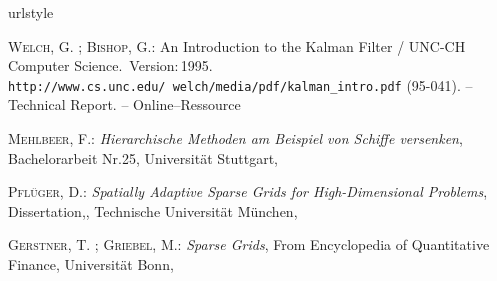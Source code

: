 \documentclass[a4paper,12pt]{llncs}
\numberwithin{equation}{section}
\begin{document}
\newpage

% 

\begin{thebibliography}{WB95}
	\providecommand{\url}[1]{\texttt{#1}}
	\expandafter\ifx\csname urlstyle\endcsname\relax
	\providecommand{\doi}[1]{doi: #1}\else
	\providecommand{\doi}{doi: \begingroup \urlstyle{rm}\Url}\fi
	
	\textsc{Welch}, G. ; \textsc{Bishop}, G.:
	\newblock An Introduction to the Kalman Filter  / UNC-CH Computer Science.
	\newblock \,Version:\,1995.
	\newblock  \url{http://www.cs.unc.edu/~welch/media/pdf/kalman_intro.pdf}
	(95-041). --
	\newblock Technical Report. --
	\newblock Online--Ressource
	
	\textsc{Mehlbeer}, F.:
	\newblock \textit{Hierarchische Methoden am Beispiel von Schiffe versenken},
	\newblock Bachelorarbeit Nr.25,
	\newblock Universität Stuttgart,
	
	\textsc{Pflüger}, D.:
	\newblock \textit{Spatially Adaptive Sparse Grids for High-Dimensional Problems},
	\newblock Dissertation,,
	\newblock Technische Universität München,
	
	\textsc{Gerstner}, T. ; \textsc{Griebel}, M.:
	\newblock \textit{Sparse Grids},
	\newblock From Encyclopedia of Quantitative Finance,
	\newblock Universität Bonn,
	
\end{thebibliography}


\end{document}
